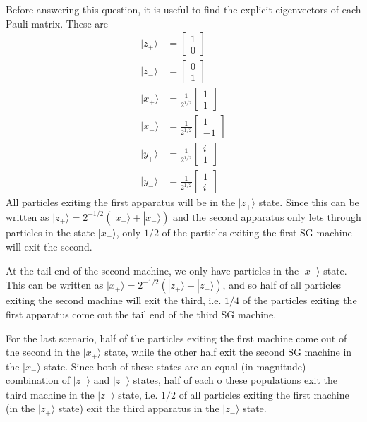\documentclass[../principles-of-quantum-mechanics.tex]{subfiles}
\begin{document}
\begin{questions}
	\begin{solution}
		Before answering this question, it is useful to find the explicit eigenvectors of each Pauli matrix. These are
		\begin{align*}
			|z_+\rangle &= \begin{bmatrix}1 \\ 0\end{bmatrix} \\
			|z_-\rangle &= \begin{bmatrix}0 \\ 1\end{bmatrix} \\
			|x_+\rangle &= \frac{1}{2^{1/2}}\begin{bmatrix}1 \\ 1\end{bmatrix} \\
			|x_-\rangle &= \frac{1}{2^{1/2}}\begin{bmatrix}1 \\ -1\end{bmatrix} \\
			|y_+\rangle &= \frac{1}{2^{1/2}}\begin{bmatrix}i \\ 1\end{bmatrix} \\
			|y_-\rangle &= \frac{1}{2^{1/2}}\begin{bmatrix}1 \\ i\end{bmatrix}
		\end{align*}
		All particles exiting the first apparatus will be in the $|z_+\rangle$ state. Since this can be written as $|z_+\rangle = 2^{-1/2}(|x_+\rangle + |x_-\rangle)$ and the second apparatus only lets through particles in the state $|x_+\rangle$, only $1/2$ of the particles exiting the first SG machine will exit the second.
		
		At the tail end of the second machine, we only have particles in the $|x_+\rangle$ state. This can be written as $|x_+\rangle = 2^{-1/2}(|z_+\rangle + |z_-\rangle)$, and so half of all particles exiting the second machine will exit the third, i.e. $1/4$ of the particles exiting the first apparatus come out the tail end of the third SG machine.
		
		For the last scenario, half of the particles exiting the first machine come out of the second in the $|x_+\rangle$ state, while the other half exit the second SG machine in the $|x_-\rangle$ state. Since both of these states are an equal (in magnitude) combination of $|z_+\rangle$ and $|z_-\rangle$ states, half of each o these populations exit the third machine in the $|z_-\rangle$ state, i.e. $1/2$ of all particles exiting the first machine (in the $|z_+\rangle$ state) exit the third apparatus in the $|z_-\rangle$ state.
		

\end{solution}
\end{questions}
\end{document}
